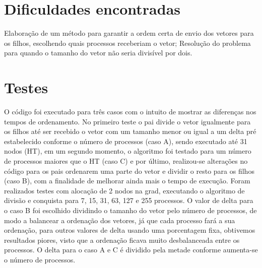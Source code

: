 \documentclass{article}
\begin{document}
\begin{multicols*}{2}
\section{Dificuldades encontradas}
Elaboração de um método para garantir a ordem certa de envio dos vetores para os filhos, escolhendo quais processos receberiam o vetor; Resolução do problema para quando o tamanho do vetor não seria divisível por dois.
\section{Testes}
 O código foi executado para três casos com o intuito de mostrar as diferenças nos tempos de ordenamento. No primeiro teste o pai divide o vetor igualmente para os filhos até ser recebido o vetor com um tamanho menor ou igual a um delta pré estabelecido conforme o número de processos (caso A), sendo executado até 31 nodos (HT), em um segundo momento, o algoritmo foi testado para um número de processos maiores que o HT (caso C) e por último, realizou-se alterações no código para os pais ordenarem uma parte do vetor e dividir o resto para os filhos (caso B), com a finalidade de melhorar ainda mais o tempo de execução. Foram realizados testes com alocação de 2 nodos na grad, executando o algoritmo de divisão e conquista para 7, 15, 31, 63, 127 e 255 processos. O valor de delta para o caso B foi escolhido dividindo o tamanho do vetor pelo número de processos, de modo a balancear a ordenação dos vetores, já que cada processo fará a sua ordenação, para outros valores de delta usando uma porcentagem fixa, obtivemos resultados piores, visto que a ordenação ficava muito desbalanceada entre os processos. O delta para o caso A e C é dividido pela metade conforme aumenta-se o número de processos.

\end{multicols*}
\end{document}
